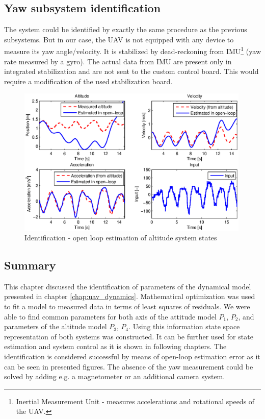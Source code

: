 \subsection{Yaw subsystem identification}

The system could be identified by exactly the same procedure as the previous subsystems. But in our case, the UAV is not equipped with any device to measure its yaw angle/velocity. It is stabilized by dead-reckoning from IMU\footnote{Inertial Measurement Unit - measures accelerations and rotational speeds of the UAV.} (yaw rate measured by a gyro). The actual data from IMU are present only in integrated stabilization and are not sent to the custom control board. This would require a modification of the used stabilization board.

\begin{figure}[h]
\includegraphics[width=0.99\textwidth]{fig/iden4.eps} 
\caption{Identification - open loop estimation of altitude system states}
\label{fig:iden4}
\end{figure}

\subsection{Summary}

This chapter discussed the identification of parameters of the dynamical model presented in chapter \ref{chap:uav_dynamics}. Mathematical optimization was used to fit a model to measured data in terms of least squares of residuals. We were able to find common parameters for both axis of the attitude model $P_1$, $P_2$, and parameters of the altitude model $P_3$, $P_4$. Using this information state space representation of both systems was constructed. It can be further used for state estimation and system control as it is shown in following chapters. The identification is considered successful by means of open-loop estimation error as it can be seen in presented figures. The absence of the yaw measurement could be solved by adding e.g. a magnetometer or an additional camera system.